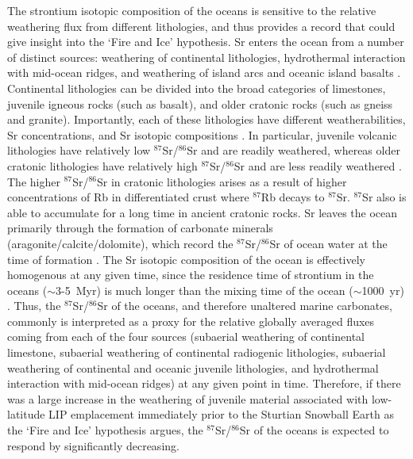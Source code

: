 \documentclass[11pt,letterpaper]{article}
\newcommand{\SrSr}{$^{87}$Sr/$^{86}$Sr\xspace}
\begin{document}
The strontium isotopic composition of the oceans is sensitive to the relative weathering flux from different lithologies, and thus provides a record that could give insight into the `Fire and Ice' hypothesis. Sr enters the ocean from a number of distinct sources: weathering of continental lithologies, hydrothermal interaction with mid-ocean ridges, and weathering of island arcs and oceanic island basalts \citep{Richter1992a}. Continental lithologies can be divided into the broad categories of limestones, juvenile igneous rocks (such as basalt), and older cratonic rocks (such as gneiss and granite). Importantly, each of these lithologies have different weatherabilities, Sr concentrations, and Sr isotopic compositions \citep{Allegre2010a}. In particular, juvenile volcanic lithologies have relatively low \SrSr and are readily weathered, whereas older cratonic lithologies have relatively high \SrSr and are less readily weathered \citep{Dessert2003a}. The higher \SrSr in cratonic lithologies arises as a result of higher concentrations of Rb in differentiated crust where $^{87}$Rb decays to $^{87}$Sr. $^{87}$Sr also is able to accumulate for a long time in ancient cratonic rocks. Sr leaves the ocean primarily through the formation of carbonate minerals (aragonite/calcite/dolomite), which record the \SrSr of ocean water at the time of formation \citep{Brand2004a}. The Sr isotopic composition of the ocean is effectively homogenous at any given time, since the residence time of strontium in the oceans ($\sim$3-5~Myr) is much longer than the mixing time of the ocean ($\sim$1000~yr) \citep{Broecker1982a}. Thus, the \SrSr of the oceans, and therefore unaltered marine carbonates, commonly is interpreted as a proxy for the relative globally averaged fluxes coming from each of the four sources (subaerial weathering of continental limestone, subaerial weathering of continental radiogenic lithologies, subaerial weathering of continental and oceanic juvenile lithologies, and hydrothermal interaction with mid-ocean ridges) at any given point in time. Therefore, if there was a large increase in the weathering of juvenile material associated with low-latitude LIP emplacement immediately prior to the Sturtian Snowball Earth as the `Fire and Ice' hypothesis argues, the \SrSr of the oceans is expected to respond by significantly decreasing.
\end{document}
